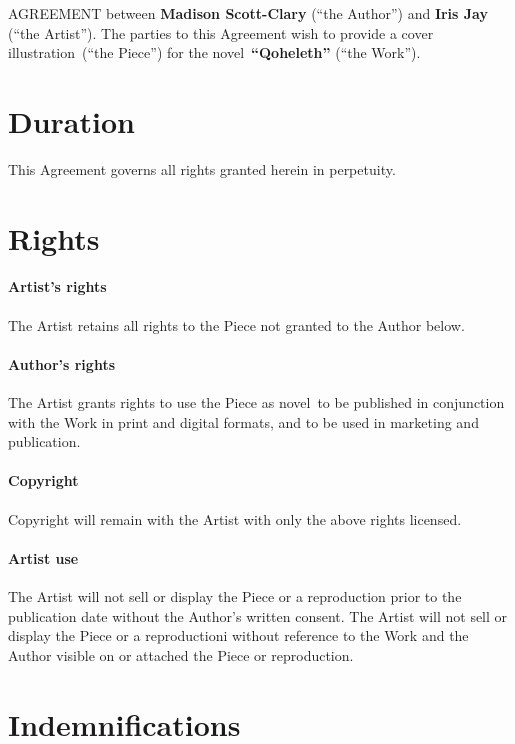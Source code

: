 \documentclass[12pt,letterpaper]{article}
\def\WorkTitle{Qoheleth}
\def\WorkAuthor{Madison Scott-Clary}
\def\WorkType{novel}
\def\Artist{Iris Jay}
\def\ArtType{a cover illustration}
\begin{document}
\noindent AGREEMENT between \textbf{\WorkAuthor} (``the Author'') and \textbf{\Artist} (``the Artist''). The parties to this Agreement wish to provide \ArtType\ (``the Piece'') for the \WorkType\ \textbf{``\WorkTitle''} (``the Work'').

\section{Duration}

This Agreement governs all rights granted herein in perpetuity.

\section{Rights}

\paragraph{Artist's rights}

The Artist retains all rights to the Piece not granted to the Author below.

\paragraph{Author's rights}

The Artist grants rights to use the Piece as \WorkType\ to be published in conjunction with the Work in print and digital formats, and to be used in marketing and publication.

\paragraph{Copyright}

Copyright will remain with the Artist with only the above rights licensed.

\paragraph{Artist use}

The Artist will not sell or display the Piece or a reproduction prior to the publication date without the Author's written consent. The Artist will not sell or display the Piece or a reproductioni without reference to the Work and the Author visible on or attached the Piece or reproduction.

\section{Indemnifications}
\end{document}
